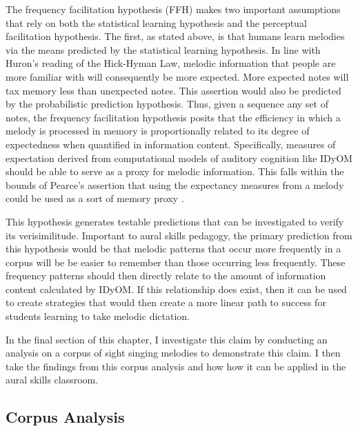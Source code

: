 \documentclass[]{book}
\begin{document}
The frequency facilitation hypothesis (FFH) makes two important assumptions that rely on both the statistical learning hypothesis and the perceptual facilitation hypothesis.
The first, as stated above, is that humans learn melodies via the means predicted by the statistical learning hypothesis.
In line with Huron's reading of the Hick-Hyman Law, melodic information that people are more familiar with will consequently be more expected.
More expected notes will tax memory less than unexpected notes.
This assertion would also be predicted by the probabilistic prediction hypothesis.
Thus, given a sequence any set of notes, the frequency facilitation hypothesis posits that the efficiency in which a melody is processed in memory is proportionally related to its degree of expectedness when quantified in information content.
Specifically, measures of expectation derived from computational models of auditory cognition like IDyOM should be able to serve as a proxy for melodic information.
This falls within the bounds of Pearce's assertion that using the expectancy measures from a melody could be used as a sort of memory proxy \citep{pearceStatisticalLearningProbabilistic2018a}.

This hypothesis generates testable predictions that can be investigated to verify its verisimilitude.
Important to aural skills pedagogy, the primary prediction from this hypothesis would be that melodic patterns that occur more frequently in a corpus will be be easier to remember than those occurring less frequently.
These frequency patterns should then directly relate to the amount of information content calculated by IDyOM.
If this relationship does exist, then it can be used to create strategies that would then create a more linear path to success for students learning to take melodic dictation.

In the final section of this chapter, I investigate this claim by conducting an analysis on a corpus of sight singing melodies to demonstrate this claim.
I then take the findings from this corpus analysis and how how it can be applied in the aural skills classroom.

\hypertarget{corpus-analysis}{%
\subsection{Corpus Analysis}\label{corpus-analysis}}
\end{document}
